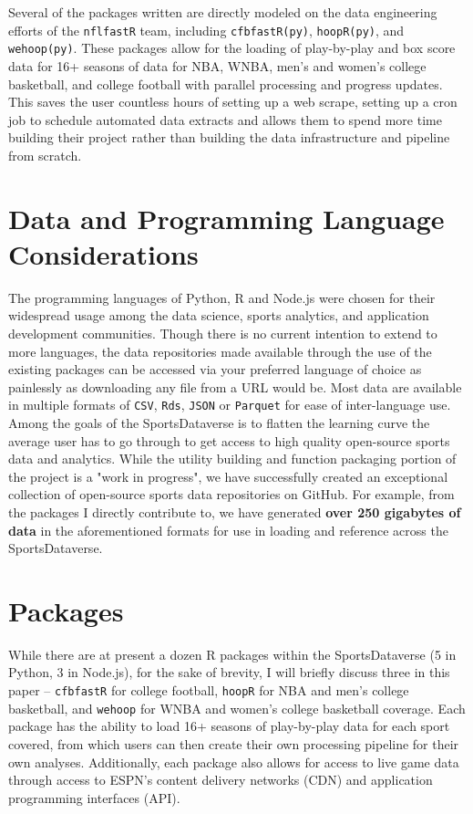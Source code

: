 \documentclass[12pt]{article}
\begin{document}
Several of the packages written are directly modeled on the data engineering efforts of the \texttt{nflfastR} team, including \texttt{cfbfastR(py)}\cite{gilani_etal_cfbfastr_2021}\cite{gilani_cfbfastRpy_2021}, \texttt{hoopR(py)}\cite{gilani_hoopR_2021}\cite{gilani_hoopRpy_2021}, and \texttt{wehoop(py)}\cite{hutchingson_gilani_2021}\cite{gilani_wehooppy_2021}. These packages allow for the loading of play-by-play and box score data for 16+ seasons of data for NBA, WNBA, men's and women's college basketball, and college football with parallel processing and progress updates. This saves the user countless hours of setting up a web scrape, setting up a cron job to schedule automated data extracts and allows them to spend more time building their project rather than building the data infrastructure and pipeline from scratch.  

\section{Data and Programming Language Considerations}
The programming languages of Python, R and Node.js were chosen for their widespread usage among the data science, sports analytics, and application development communities. Though there is no current intention to extend to more languages, the data repositories made available through the use of the existing packages can be accessed via your preferred language of choice as painlessly as downloading any file from a URL would be. Most data are available in multiple formats of \texttt{CSV}, \texttt{Rds}, \texttt{JSON} or \texttt{Parquet} for ease of inter-language use. Among the goals of the SportsDataverse is to flatten the learning curve the average user has to go through to get access to high quality open-source sports data and analytics. While the utility building and function packaging portion of the project is a "work in progress", we have successfully created an exceptional collection of open-source sports data repositories on GitHub. For example, from the packages I directly contribute to, we have generated \textbf{over 250 gigabytes of data} in the aforementioned formats for use in loading and reference across the SportsDataverse. 

\section{Packages}
While there are at present a dozen R packages within the SportsDataverse (5 in Python, 3 in Node.js), for the sake of brevity, I will briefly discuss three in this paper -- \texttt{cfbfastR} for college football, \texttt{hoopR} for NBA and men's college basketball, and \texttt{wehoop} for WNBA and women's college basketball coverage. Each package has the ability to load 16+ seasons of play-by-play data for each sport covered, from which users can then create their own processing pipeline for their own analyses. Additionally, each package also allows for access to live game data through access to ESPN's content delivery networks (CDN) and application programming interfaces (API). 
\end{document}
